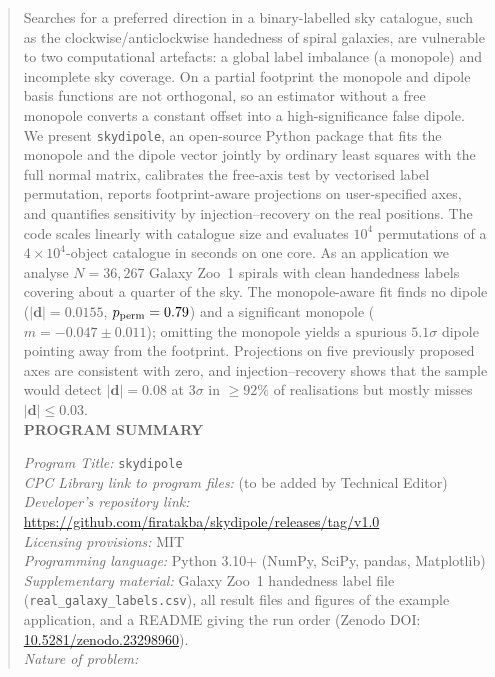\documentclass[preprint,12pt]{elsarticle}
\begin{document}
\begin{frontmatter}
\begin{abstract}
Searches for a preferred direction in a binary-labelled sky catalogue, such as the clockwise/anticlockwise handedness of spiral galaxies, are vulnerable to two computational artefacts: a global label imbalance (a monopole) and incomplete sky coverage. On a partial footprint the monopole and dipole basis functions are not orthogonal, so an estimator without a free monopole converts a constant offset into a high-significance false dipole. We present \texttt{skydipole}, an open-source Python package that fits the monopole and the dipole vector jointly by ordinary least squares with the full normal matrix, calibrates the free-axis test by vectorised label permutation, reports footprint-aware projections on user-specified axes, and quantifies sensitivity by injection--recovery on the real positions. The code scales linearly with catalogue size and evaluates $10^4$ permutations of a $4\times10^4$-object catalogue in seconds on one core. As an application we analyse $N=36{,}267$ Galaxy Zoo~1 spirals with clean handedness labels covering about a quarter of the sky. The monopole-aware fit finds no dipole ($|\mathbf d| = 0.0155$, $p_{\rm perm}=0.79$) and a significant monopole ($m=-0.047\pm0.011$); omitting the monopole yields a spurious $5.1\sigma$ dipole pointing away from the footprint. Projections on five previously proposed axes are consistent with zero, and injection--recovery shows that the sample would detect $|\mathbf d|=0.08$ at $3\sigma$ in $\ge92\%$ of realisations but mostly misses $|\mathbf d|\le0.03$.
\\[1ex]
\noindent \textbf{PROGRAM SUMMARY}
\begin{small}
\noindent
{\em Program Title:} \texttt{skydipole} \\
{\em CPC Library link to program files:} (to be added by Technical Editor) \\
{\em Developer's repository link:} \url{https://github.com/firatakba/skydipole/releases/tag/v1.0} \\
{\em Licensing provisions:} MIT \\
{\em Programming language:} Python 3.10+ (NumPy, SciPy, pandas, Matplotlib) \\
{\em Supplementary material:} Galaxy Zoo~1 handedness label file (\texttt{real\_galaxy\_labels.csv}), all result files and figures of the example application, and a README giving the run order (Zenodo DOI: \href{https://doi.org/10.5281/zenodo.23298960}{10.5281/zenodo.23298960}). \\
{\em Nature of problem:}

\end{small}
\end{abstract}
\end{frontmatter}
\end{document}
